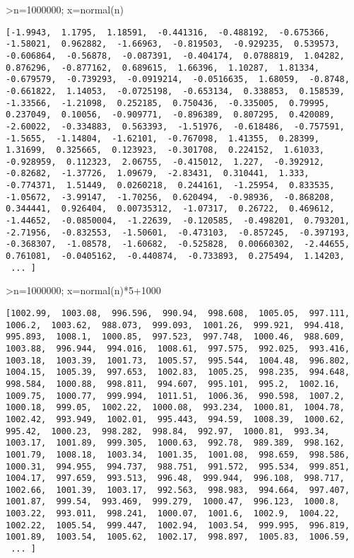 \documentclass[
]{book}
\begin{document}
\textgreater n=1000000; x=normal(n)

\begin{verbatim}
[-1.9943,  1.1795,  1.18591,  -0.441316,  -0.488192,  -0.675366,
-1.58021,  0.962882,  -1.66963,  -0.819503,  -0.929235,  0.539573,
-0.606864,  -0.56878,  -0.087391,  -0.404174,  0.0788819,  1.04282,
0.876296,  -0.877162,  0.689615,  1.66396,  1.10287,  1.81334,
-0.679579,  -0.739293,  -0.0919214,  -0.0516635,  1.68059,  -0.8748,
-0.661822,  1.14053,  -0.0725198,  -0.653134,  0.338853,  0.158539,
-1.33566,  -1.21098,  0.252185,  0.750436,  -0.335005,  0.79995,
0.237049,  0.10056,  -0.909771,  -0.896389,  0.807295,  0.420089,
-2.60022,  -0.334883,  0.563393,  -1.51976,  -0.618486,  -0.757591,
-1.5655,  -1.14804,  -1.62101,  -0.767098,  1.41355,  0.28399,
1.31699,  0.325665,  0.123923,  -0.301708,  0.224152,  1.61033,
-0.928959,  0.112323,  2.06755,  -0.415012,  1.227,  -0.392912,
-0.82682,  -1.37726,  1.09679,  -2.83431,  0.310441,  1.333,
-0.774371,  1.51449,  0.0260218,  0.244161,  -1.25954,  0.833535,
-1.05672,  -3.99147,  -1.70256,  0.620494,  -0.98936,  -0.868208,
0.344441,  0.926404,  0.00735312,  -1.07317,  0.26722,  0.469612,
-1.44652,  -0.0850004,  -1.22639,  -0.120585,  -0.498201,  0.793201,
-2.71956,  -0.832553,  -1.50601,  -0.473103,  -0.857245,  -0.397193,
-0.368307,  -1.08578,  -1.60682,  -0.525828,  0.00660302,  -2.44655,
0.761081,  -0.0405162,  -0.440874,  -0.733893,  0.275494,  1.14203,
 ... ]
\end{verbatim}

\textgreater n=1000000; x=normal(n)*5+1000

\begin{verbatim}
[1002.99,  1003.08,  996.596,  990.94,  998.608,  1005.05,  997.111,
1006.2,  1003.62,  988.073,  999.093,  1001.26,  999.921,  994.418,
995.893,  1008.1,  1000.85,  997.523,  997.748,  1000.46,  988.609,
1003.88,  996.944,  994.016,  1008.61,  997.575,  992.025,  993.416,
1003.18,  1003.39,  1001.73,  1005.57,  995.544,  1004.48,  996.802,
1004.15,  1005.39,  997.653,  1002.83,  1005.25,  998.235,  994.648,
998.584,  1000.88,  998.811,  994.607,  995.101,  995.2,  1002.16,
1009.75,  1000.77,  999.994,  1011.51,  1006.36,  990.598,  1007.2,
1000.18,  999.05,  1002.22,  1000.08,  993.234,  1000.81,  1004.78,
1002.42,  993.949,  1002.01,  995.443,  994.59,  1008.39,  1000.62,
995.42,  1000.23,  998.282,  998.84,  992.97,  1000.81,  993.34,
1003.17,  1001.89,  999.305,  1000.63,  992.78,  989.389,  998.162,
1001.79,  1008.18,  1003.34,  1001.35,  1001.08,  998.659,  998.586,
1000.31,  994.955,  994.737,  988.751,  991.572,  995.534,  999.851,
1004.17,  997.659,  993.513,  996.48,  999.944,  996.108,  998.717,
1002.66,  1001.39,  1003.17,  992.563,  998.983,  994.664,  997.407,
1001.87,  999.54,  993.469,  999.279,  1000.47,  996.123,  1000.8,
1003.22,  993.011,  998.241,  1000.07,  1001.6,  1002.9,  1004.22,
1002.22,  1005.54,  999.447,  1002.94,  1003.54,  999.995,  996.819,
1001.89,  1003.54,  1005.62,  1002.17,  998.897,  1005.83,  1006.59,
 ... ]
\end{verbatim}
\end{document}
